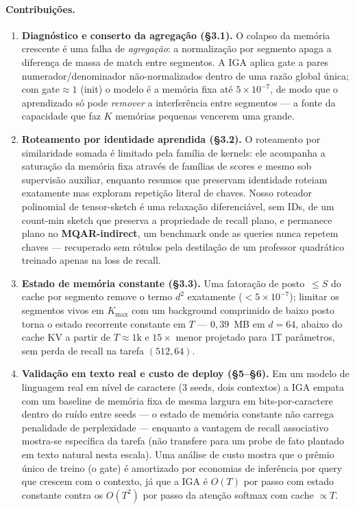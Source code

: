 \documentclass[11pt]{article}
\begin{document}
\paragraph{Contribui\c{c}\~oes.}
\begin{enumerate}
\item \textbf{Diagn\'ostico e conserto da agrega\c{c}\~ao (\S3.1).} O colapso da
  mem\'oria crescente \'e uma falha de \emph{agrega\c{c}\~ao}: a normaliza\c{c}\~ao
  por segmento apaga a diferen\c{c}a de massa de match entre segmentos. A IGA
  aplica gate a pares numerador/denominador n\~ao-normalizados dentro de uma
  raz\~ao global \'unica; com gate$\approx 1$ (init) o modelo \'e a mem\'oria fixa
  at\'e $5\times10^{-7}$, de modo que o aprendizado s\'o pode \emph{remover} a
  interfer\^encia entre segmentos --- a fonte da capacidade que faz $K$ mem\'orias
  pequenas vencerem uma grande.

\item \textbf{Roteamento por identidade aprendida (\S3.2).} O roteamento por
  similaridade somada \'e limitado pela fam\'ilia de kernels: ele acompanha a
  satura\c{c}\~ao da mem\'oria fixa atrav\'es de fam\'ilias de scores e mesmo sob
  supervis\~ao auxiliar, enquanto resumos que preservam identidade roteiam
  exatamente mas exploram repeti\c{c}\~ao literal de chaves. Nosso roteador
  polinomial de tensor-sketch \citep{pham2013tensorsketch} \'e uma relaxa\c{c}\~ao
  diferenci\'avel, sem IDs, de um count-min sketch que preserva a propriedade de
  recall plano, e permanece plano no \textbf{MQAR-indirect}, um benchmark onde as
  queries nunca repetem chaves --- recuperado sem r\'otulos pela destila\c{c}\~ao
  de um professor quadr\'atico treinado apenas na loss de recall.

\item \textbf{Estado de mem\'oria constante (\S3.3).} Uma fatora\c{c}\~ao de
  posto~$\le S$ do cache por segmento remove o termo $d^2$ exatamente
  ($<\!5\times10^{-7}$); limitar os segmentos vivos em $K_{\max}$ com um
  background comprimido de baixo posto torna o estado recorrente constante em
  $T$ --- $0{,}39$~MB em $d=64$, abaixo do cache KV a partir de
  $T\!\approx\!1\mathrm{k}$ e $15\times$ menor projetado para 1T par\^ametros,
  sem perda de recall na tarefa $(512,64)$.

\item \textbf{Valida\c{c}\~ao em texto real e custo de deploy (\S5--\S6).} Em um
  modelo de linguagem real em n\'ivel de caractere (3 seeds, dois contextos) a
  IGA empata com um baseline de mem\'oria fixa de mesma largura em
  bits-por-caractere dentro do ru\'ido entre seeds --- o estado de mem\'oria
  constante n\~ao carrega penalidade de perplexidade --- enquanto a vantagem de
  recall associativo mostra-se espec\'ifica da tarefa (n\~ao transfere para um
  probe de fato plantado em texto natural nesta escala). Uma an\'alise de custo
  mostra que o pr\^emio \'unico de treino (o gate) \'e amortizado por economias de
  infer\^encia por query que crescem com o contexto, j\'a que a IGA \'e $O(T)$ por
  passo com estado constante contra os $O(T^2)$ por passo da aten\c{c}\~ao softmax
  com cache $\propto T$.
\end{enumerate}
\end{document}

